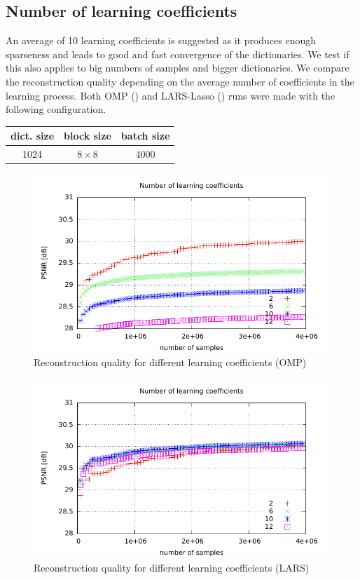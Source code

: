 \subsection{Number of learning coefficients}
An average of 10 learning coefficients is suggested as it produces enough
sparseness and leads to good and fast convergence of the dictionaries.
We test if this also applies to big numbers of samples and bigger
dictionaries. We compare the reconstruction quality depending on the average
number of coefficients in the learning process. 
Both OMP () and LARS-Lasso
() runs were made with the following
configuration.
\begin{table}[H]
\centering
\begin{tabular}{| c | c | c |}
\hline
\hline
dict. size & block size & batch size \\
\hline
1024 & $8\times 8$ & 4000  \\
\hline
\end{tabular}
\end{table}
\begin{figure}[H]
\centering
\includegraphics[width =
1.0\textwidth]{../tests/results/coeffsConvergOMP.pdf}
\caption{Reconstruction quality for different learning coefficients (OMP)}
\label{fig:coeffsOMP}
\end{figure}
\begin{figure}[H]
\centering
\includegraphics[width = 1.0\textwidth]{../tests/results/coeffsConverg.pdf}
\caption{Reconstruction quality for different learning coefficients (LARS)}
\label{fig:coeffsLasso}
\end{figure}
